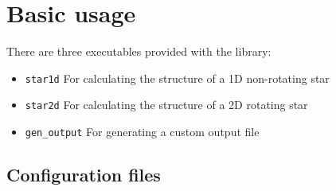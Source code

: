 \chapter{Basic usage}

There are three executables provided with the library:
\begin{itemize}
\item {\tt star1d} For calculating the structure of a 1D non-rotating star
\item {\tt star2d} For calculating the structure of a 2D rotating star
\item {\tt gen\_output} For generating a custom output file
\end{itemize}

\section{Configuration files}

